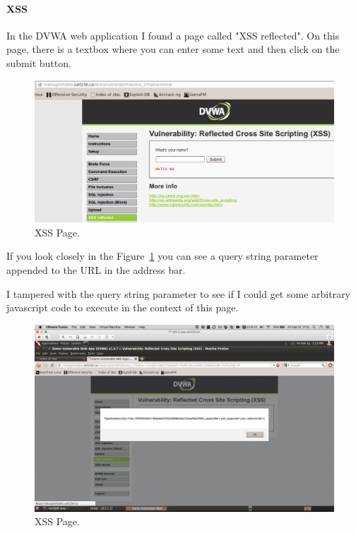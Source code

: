 \documentclass{article}
\begin{document}
\paragraph{XSS}
In the DVWA web application I found a page called "XSS reflected". 
On this page, there is a textbox where you can enter some text and then 
click on the submit button.

\begin{figure}[h!]
	\includegraphics[width=\linewidth]{images/dvwa-xss-page.png}
	\caption{XSS Page.}
	\label{fig:xss-page1}
\end{figure}

If you look closely in the Figure~\ref{fig:xss-page1} you can see a 
query string parameter appended to the URL in the address bar.

\newpage
I tampered with the query string parameter to see if I could get
some arbitrary javascript code to execute in the context of this
page.

\begin{figure}[h!]
	\includegraphics[width=\linewidth]{images/dvwa-xss-page-exploit.png}
	\caption{XSS Page.}
	\label{fig:xss-page2}
\end{figure}
\end{document}
